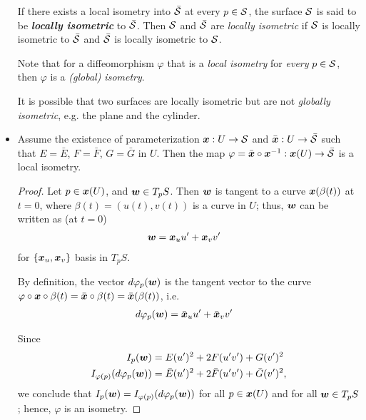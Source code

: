 \documentclass[11pt]{article}
\begin{document}
\begin{itemize}
\begin{definition}
If there exists a local isometry into $\bar{{\mathcal S}}$ at every $p\in {\mathcal S}$, the surface ${\mathcal S}$ is said to be \emph{\textbf{locally isometric}} to $\bar{{\mathcal S}}$. Then ${\mathcal S}$ and $\bar{{\mathcal S}}$ are \emph{locally isometric} if ${\mathcal S}$ is locally isometric to $\bar{{\mathcal S}}$ and $\bar{{\mathcal S}}$ is locally isometric to ${\mathcal S}$. 
\end{definition}

Note that for a diffeomorphism $\varphi$ that is a \emph{local isometry} for \emph{every} $p\in {\mathcal S}$, then $\varphi$ is a \emph{(global) isometry}. 

It is possible that two surfaces are locally isometric but are not \emph{globally isometric}, e.g. the plane and the cylinder. 

\item \begin{proposition}\label{prop: local_iso}
Assume the existence of parameterization $\boldsymbol{x}: U\rightarrow {\mathcal S}$ and $\bar{\boldsymbol{x}}: U\rightarrow \bar{{\mathcal S}}$ such that $E=\bar{E}$, $F=\bar{F}$, $G=\bar{G}$ in $U$. Then the map $\varphi= \bar{\boldsymbol{x}}\circ \boldsymbol{x}^{-1}:  \boldsymbol{x}(U) \rightarrow \bar{{\mathcal S}}$ is a local isometry. 
\end{proposition}
\begin{proof}
Let $p\in \boldsymbol{x}(U)$, and $\boldsymbol{w}\in T_{p}S$. Then  $\boldsymbol{w}$ is tangent to a curve $\boldsymbol{x}(\beta(t))$ at $t=0$, where $\beta(t) = (u(t), v(t))$ is a curve in $U$; thus, $\boldsymbol{w}$ can be written as (at $t=0$)
\begin{align*}
\boldsymbol{w} &= \boldsymbol{x}_{u}u' + \boldsymbol{x}_{v}v'
\end{align*} for $\left\{\boldsymbol{x}_{u}, \boldsymbol{x}_{v}\right\}$ basis in $T_{p}S$.

By definition, the vector $d\varphi_{p}(\boldsymbol{w})$ is the tangent vector to the curve $\varphi\circ \boldsymbol{x}\circ\beta(t) = \bar{\boldsymbol{x}}\circ\beta(t) = \bar{\boldsymbol{x}}(\beta(t))$, i.e. 
\begin{align*}
d\varphi_{p}(\boldsymbol{w}) &= \bar{\boldsymbol{x}}_{u}u' + \bar{\boldsymbol{x}}_{v}v'
\end{align*}

Since 
\begin{align*}
I_{p}(\boldsymbol{w}) &= E(u')^{2} + 2F(u'v')+ G(v')^{2}\\
I_{\varphi(p)}(d\varphi_{p}(\boldsymbol{w}))&= \bar{E}(u')^{2} + 2\bar{F}(u'v')+ \bar{G}(v')^{2}, 
\end{align*}
we conclude that $I_{p}(\boldsymbol{w})  = I_{\varphi(p)}(d\varphi_{p}(\boldsymbol{w}))$ for all $p\in \boldsymbol{x}(U)$ and for all $\boldsymbol{w}\in T_{p}S$; hence, $\varphi$ is an isometry. \QEDA
\end{proof}



\end{itemize}
\end{document}
